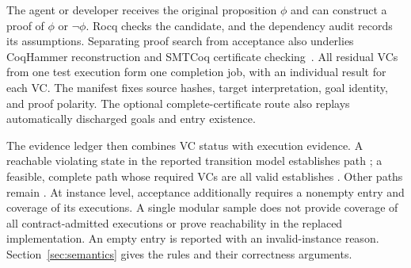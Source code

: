 The agent or developer receives the original proposition $\phi$ and can
construct a proof of $\phi$ or $\neg\phi$. Rocq checks the candidate,
and the dependency audit records its assumptions.
Separating proof search from acceptance also underlies \mbox{CoqHammer}
reconstruction and SMTCoq certificate
checking~\cite{czajka2018coqhammer,ekici2017smtcoq}.
All residual VCs from one test execution form one completion job, with
an individual result for each VC.
The manifest fixes source hashes, target interpretation, goal identity,
and proof polarity. The optional complete-certificate route also replays
automatically discharged goals and entry existence.

The evidence ledger then combines VC status with execution evidence.
A reachable violating state in the reported transition model establishes
path \fail{}; a feasible,
complete path whose required VCs are all valid establishes \pass{}.
Other paths remain \unknown{}.
At instance level, acceptance additionally requires a nonempty entry
and coverage of its executions. A single modular sample does not provide
coverage of all contract-admitted executions or prove reachability in the
replaced implementation.
An empty entry is reported with an invalid-instance reason.
Section~\ref{sec:semantics} gives the rules and their correctness arguments.


